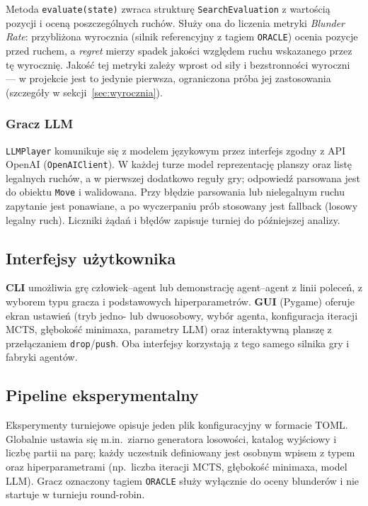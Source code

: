 \documentclass[11pt, a4paper]{article}
\begin{document}
Metoda \texttt{evaluate(state)} zwraca strukturę \texttt{SearchEvaluation} z wartością pozycji i oceną poszczególnych ruchów. Służy ona do liczenia metryki \textit{Blunder Rate}: przybliżona wyrocznia (silnik referencyjny z tagiem \texttt{ORACLE}) ocenia pozycje przed ruchem, a \textit{regret} mierzy spadek jakości względem ruchu wskazanego przez tę wyrocznię. Jakość tej metryki zależy wprost od siły i bezstronności wyroczni --- w projekcie jest to jedynie pierwsza, ograniczona próba jej zastosowania (szczegóły w sekcji~\ref{sec:wyrocznia}).

\subsubsection{Gracz LLM}

\texttt{LLMPlayer} komunikuje się z modelem językowym przez interfejs zgodny z API OpenAI (\texttt{OpenAIClient}). W każdej turze model reprezentację planszy oraz listę legalnych ruchów, a w pierwszej dodatkowo reguły gry; odpowiedź parsowana jest do obiektu \texttt{Move} i walidowana. Przy błędzie parsowania lub nielegalnym ruchu zapytanie jest ponawiane, a po wyczerpaniu prób stosowany jest fallback (losowy legalny ruch). Liczniki żądań i błędów zapisuje turniej do późniejszej analizy.

\subsection{Interfejsy użytkownika}

\textbf{CLI} umożliwia grę człowiek--agent lub demonstrację agent--agent z linii poleceń, z wyborem typu gracza i podstawowych hiperparametrów. \textbf{GUI} (Pygame) oferuje ekran ustawień (tryb jedno- lub dwuosobowy, wybór agenta, konfiguracja iteracji MCTS, głębokość minimaxa, parametry LLM) oraz interaktywną planszę z przełączaniem \texttt{drop}/\texttt{push}. Oba interfejsy korzystają z tego samego silnika gry i fabryki agentów.

\subsection{Pipeline eksperymentalny}

Eksperymenty turniejowe opisuje jeden plik konfiguracyjny w formacie TOML. Globalnie ustawia się m.in.\ ziarno generatora losowości, katalog wyjściowy i liczbę partii na parę; każdy uczestnik definiowany jest osobnym wpisem z typem oraz hiperparametrami (np.\ liczba iteracji MCTS, głębokość minimaxa, model LLM). Gracz oznaczony tagiem \texttt{ORACLE} służy wyłącznie do oceny blunderów i nie startuje w turnieju round-robin.
\end{document}
